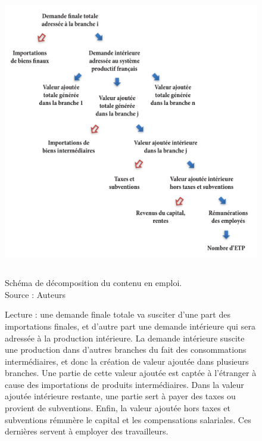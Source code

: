 \begin{figure}[!hb]
	\centering
	\includegraphics[height=12cm]{figures/Schema_decompo/schema_decompo.pdf}
	\caption{Schéma de décomposition du contenu en emploi. \\Source : Auteurs}
	\label{fig:schema_decompo}
	\captionsetup{justification=raggedright}
	\caption*{Lecture : une demande finale totale va susciter d’une part des importations finales, et d’autre part une demande intérieure qui sera adressée à la production intérieure. La demande intérieure suscite une production dans d’autres branches du fait des consommations intermédiaires, et donc la création de valeur ajoutée dans plusieurs branches. Une partie de cette valeur ajoutée est captée à l’étranger à cause des importations de produits intermédiaires. Dans la valeur ajoutée intérieure restante, une partie sert à payer des taxes ou provient de subventions. Enfin, la valeur ajoutée hors taxes et subventions rémunère le capital et les compensations salariales. Ces dernières servent à employer des travailleurs.}
\end{figure}


